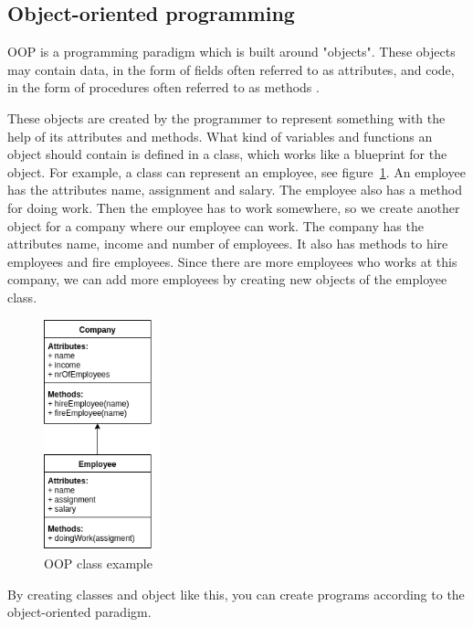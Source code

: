 \documentclass {article}
\begin{document}
\subsection{Object-oriented programming}
OOP is a programming paradigm which is built around "objects". These objects may contain data, in the form of fields often referred to as attributes, and code, in the form of procedures often referred to as methods \cite{kindler}.
 
These objects are created by the programmer to represent something with the help of its attributes and methods. What kind of variables and functions an object should contain is defined in a class, which works like a blueprint for the object. For example, a class can represent an employee, see figure~\ref{fig:oop-example}. An employee has the attributes name, assignment and salary. The employee also has a method for doing work. Then the employee has to work somewhere, so we create another object for a company where our employee can work. The company has the attributes name, income and number of employees. It also has methods to hire employees and fire employees. Since there are more employees who works at this company, we can add more employees by creating new objects of the employee class.
 
\begin{figure}[H]
\centering
\includegraphics[width=0.3\textwidth]{oop-example}

\caption {OOP class example}
\label{fig:oop-example}
\end {figure}
 
By creating classes and object like this, you can create programs according to the object-oriented paradigm.
 
\end{document}
